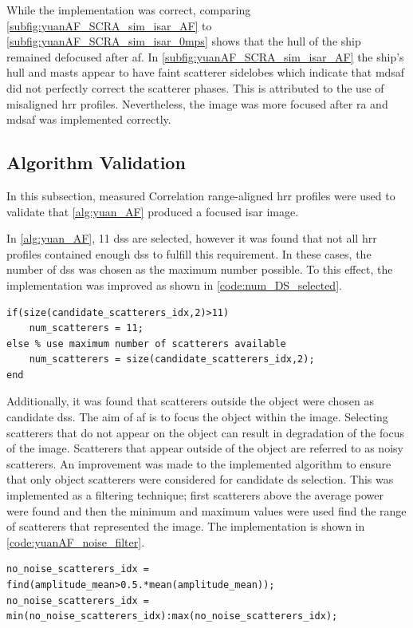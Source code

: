 \documentclass[class=report,11pt,crop=false]{standalone}
\begin{document}
    While the implementation was correct, comparing \autoref{subfig:yuanAF_SCRA_sim_isar_AF} to \autoref{subfig:yuanAF_SCRA_sim_isar_0mps} shows that the hull of the ship remained defocused after \gls{af}. In \autoref{subfig:yuanAF_SCRA_sim_isar_AF} the ship's hull and masts appear to have faint scatterer sidelobes which indicate that \gls{mdsaf} did not perfectly correct the scatterer phases. This is attributed to the use of misaligned \gls{hrr} profiles. Nevertheless, the image was more focused after \gls{ra} and \gls{mdsaf} was implemented correctly.
    
    \subsection{Algorithm Validation}
    In this subsection, measured Correlation range-aligned \gls{hrr} profiles were used to validate that \autoref{alg:yuan_AF} produced a focused \gls{isar} image. 
    
    In \autoref{alg:yuan_AF}, 11 \gls{ds}s are selected, however it was found that not all \gls{hrr} profiles contained enough \gls{ds}s to fulfill this requirement. In these cases, the number of \gls{ds}s was chosen as the maximum number possible. To this effect, the implementation was improved as shown in \autoref{code:num_DS_selected}.
\begin{lstlisting}[caption={\textsc{MATLAB} code for selecting number of \gls{ds}s.},label={code:num_DS_selected}]
if(size(candidate_scatterers_idx,2)>11)
    num_scatterers = 11;
else % use maximum number of scatterers available
    num_scatterers = size(candidate_scatterers_idx,2); 
end
\end{lstlisting}   

    Additionally, it was found that scatterers outside the object were chosen as candidate \gls{ds}s. The aim of \gls{af} is to focus the object within the image. Selecting scatterers that do not appear on the object can result in degradation of the focus of the image. Scatterers that appear outside of the object are referred to as noisy scatterers. An improvement was made to the implemented algorithm to ensure that only object scatterers were considered for candidate \gls{ds} selection. This was implemented as a filtering technique; first scatterers above the average power were found and then the minimum and maximum values were used find the range of scatterers that represented the image. The implementation is shown in \autoref{code:yuanAF_noise_filter}.
\begin{lstlisting}[caption={\textsc{MATLAB} code for filtering scatterers used in candidate \gls{ds} selection.},label={code:yuanAF_noise_filter}]
no_noise_scatterers_idx = find(amplitude_mean>0.5.*mean(amplitude_mean));
no_noise_scatterers_idx = min(no_noise_scatterers_idx):max(no_noise_scatterers_idx);
\end{lstlisting}
\end{document}
